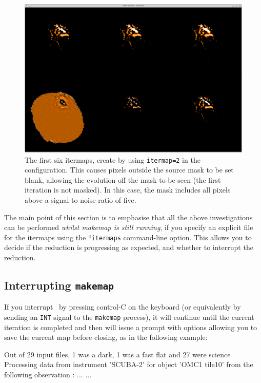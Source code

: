 \begin{terminalv}
\begin{figure}
\begin{center}
  \includegraphics[width=\linewidth]{sc21_itermaps_masked}
\end{center}
\caption[Initial six itermaps with masking]{\small The first six
itermaps, create by using \texttt{itermap=2} in the configuration. This
causes pixels outside the source mask to be set blank, allowing the evolution
off the mask to be seen (the first iteration is not masked). In this
case, the mask includes all pixels above a signal-to-noise ratio of five.}
\label{fig:maskeditermaps}
\end{figure}

The main point of this section is to emphasise that all the above
investigations can be performed \emph{whilst makemap is still running},
if you specify an explicit file for the itermaps using the
``\texttt{itermaps} command-line option. This allows you to decide if
the reduction is progressing as expected, and whether to interrupt the
reduction.


\subsection{Interrupting \texttt{makemap}}

If you interrupt \makemap\ by pressing control-C on the keyboard (or
equivalently by sending an \texttt{INT} signal to the \texttt{makemap}
process), it will continue until the current iteration is completed
and then will issue a prompt with options allowing you to save the current
map before closing, as in the following example:

\begin{terminalv}
Out of 29 input files, 1 was a dark, 1 was a fast flat and 27 were science
Processing data from instrument 'SCUBA-2' for object 'OMC1 tile10' from the
following observation  :
...
...
\end{terminalv}


\end{terminalv}

